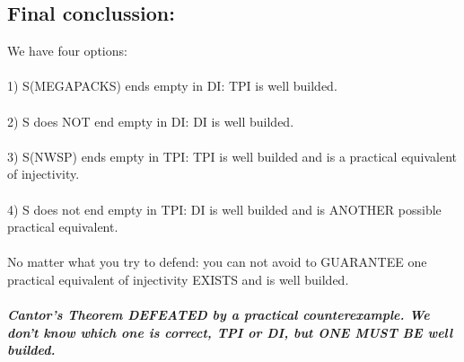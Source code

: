 		\subsection {Final conclussion:}
		
		
			\noindent
			We have four options:\\\\
			1) S(MEGAPACKS) ends empty in DI: TPI is well builded.\\\\
			2) S does NOT end empty in DI: DI is well builded.\\\\
			3) S(NWSP) ends empty in TPI: TPI is well builded and is a practical equivalent of injectivity.\\\\
			4) S does not end empty in TPI: DI is well builded and is ANOTHER possible practical equivalent.
			\\\\
			
			\noindent
			No matter what you try to defend: you can not avoid to GUARANTEE one practical equivalent of injectivity EXISTS and is well builded.
			\\\\
			
			\noindent
			\textbf{\textit{Cantor's Theorem DEFEATED by a practical counterexample. We don't know which one is correct, TPI or DI, but ONE MUST BE well builded.}}
			\\\\
			\\\\
			
			
			
			
			 

			 
				
		
		
	
	
	
	
	
	
	